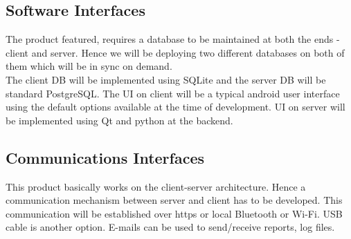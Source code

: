 \subsection{Software Interfaces}
\hspace*{0.82cm}The product featured, requires a database to be maintained at both the ends - client and server.
Hence we will be deploying two different databases on both of them which will be in sync on
demand.\\[0.5cm]
\hspace*{0.82cm}The client DB will be implemented using SQLite and the server DB will be standard
PostgreSQL. The UI on client will be a typical android user interface using the default options
available at the time of development. UI on server will be implemented using Qt and python at the
backend.

\subsection{Communications Interfaces}
\hspace*{0.82cm}This product basically works on the client-server architecture. Hence a communication
mechanism between server and client has to be developed. This communication will be established
over https or local Bluetooth or Wi-Fi. USB cable is another option. E-mails can be used to
send/receive reports, log files.